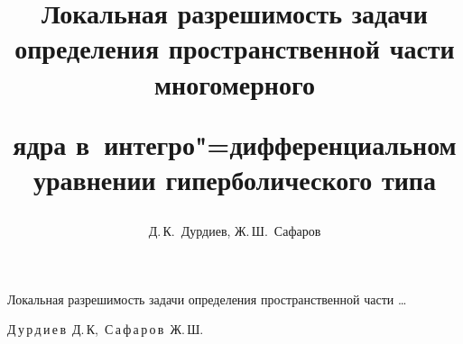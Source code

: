 
%

% 


% 





\renewcommand{\firstpage}{37}

\renewcommand{\lastpage}{47}

















\title{Локальная разрешимость задачи определения пространственной части многомерного

ядра в~интегро"=дифференциальном уравнении гиперболического типа}%

{Локальная разрешимость задачи определения пространственной части \dots}%



\author{Д.\,К.~Дурдиев, Ж.\,Ш.~Сафаров }%

{Д\,у\,р\,д\,и\,е\,в~Д.\,К,\, С\,а\,ф\,а\,р\,о\,в~Ж.\,Ш.\ }%





